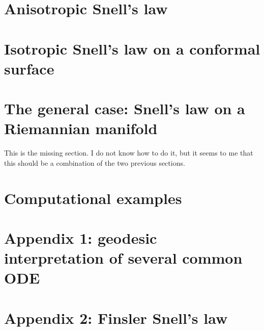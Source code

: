 \section{Anisotropic Snell's law}

\section{Isotropic Snell's law on a conformal surface}

\section{The general case: Snell's law on a Riemannian manifold}

This is the missing section.  I do not know how to do it, but it seems to me
that this should be a combination of the two previous sections.

\section{Computational examples}

\section{Appendix 1: geodesic interpretation of several common ODE}

\section{Appendix 2: Finsler Snell's law}


